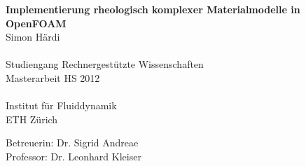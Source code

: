 {
    \fancyhf{}
    \fancyhfoffset[LR]{3em}
    \renewcommand{\headrulewidth}{0pt}
}
\begin{titlepage}
\thispagestyle{titlepage}
\begin{center}
    \vspace*{1cm}
    {\huge \bfseries Implementierung rheologisch komplexer Materialmodelle in OpenFOAM\\}
    \vspace{2cm}
    {\large 
        Simon Härdi\\
	~\\
	Studiengang Rechnergestützte Wissenschaften\\
	\vspace{3.5cm}
	Masterarbeit HS 2012\\
	~\\
	Institut für Fluiddynamik\\
	ETH Zürich\\
    }




{\large
	Betreuerin: Dr. Sigrid Andreae\\[\baselineskip]
	Professor: Dr. Leonhard Kleiser
}
\end{center}

\vspace*{2cm}

\end{titlepage}
